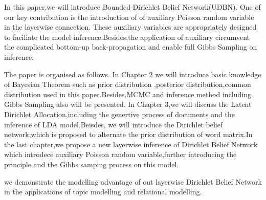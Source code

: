 In this paper,we will introduce Bounded-Dirichlet Belief Network(UDBN). One of our key contribution is the introduction of of auxiliary Poisson random variable in the layerwise connection. These auxiliary variables are appropriately designed to faciliate the model inference.Besides,the application of auxiliary circumvent the complicated bottom-up back-propagation and enable full Gibbs Sampling on inference.

The paper is organised as follows. In Chapter 2 we will introduce basic knowledge of Bayesian Theorem such as prior distribution ,posterior distribution,common distribution used in this paper.Besides,MCMC and inference method including Gibbs Sampling also will be presented. In Chapter 3,we will discuss the Latent Dirichlet Allocation,including the genertive process of documents and the inference of LDA model.Beisdes, we will introduce the Dirichlet belief network,which is proposed to alternate the prior distribution of word matrix.In the last chapter,we propose a new layerwise inference of Dirichlet Belief Network which introdece auxiliary Poisson random variable,further introducing the principle and the Gibbs samping process on this model.

we demonstrate the modelling advantage of out layerwise  Dirichlet Belief Network in the applications of topic modelling and relational modelling.
